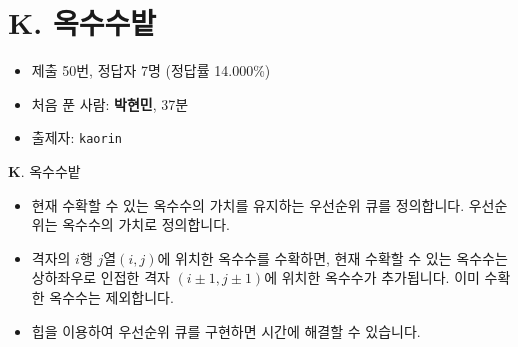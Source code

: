 \section{K. 옥수수밭}

\begin{frame} %
    \begin{itemize}
        \item 제출 50번, 정답자 7명 (정답률 14.000\%)
        \item 처음 푼 사람: \textbf{박현민}, 37분
        \item 출제자: \texttt{kaorin}
    \end{itemize}
\end{frame}

\begin{frame}{\textbf{K}. 옥수수밭}
    \begin{itemize}
        \item 현재 수확할 수 있는 옥수수의 가치를 유지하는 우선순위 큐를 정의합니다. 우선순위는 옥수수의 가치로 정의합니다.
        \item 격자의 $i$행 $j$열$(i, j)$에 위치한 옥수수를 수확하면, 현재 수확할 수 있는 옥수수는 상하좌우로 인접한 격자 $(i \pm 1, j \pm 1)$에 위치한 옥수수가 추가됩니다. 이미 수확한 옥수수는 제외합니다.
        \item 힙을 이용하여 우선순위 큐를 구현하면 시간에 해결할 수 있습니다.
    \end{itemize}
\end{frame}